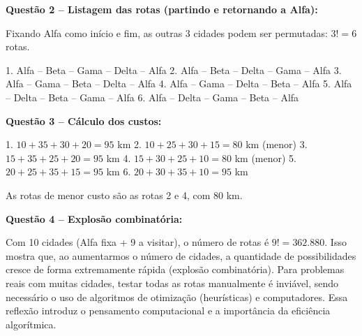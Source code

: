 \documentclass[
  12pt,
  oneside,
  a4paper,
  english,
  brazilian
  ]{abntex2}
\theoremstyle{definition}
\begin{document}
\begin{apendicesenv}
\textbf{Questão 2 – Listagem das rotas (partindo e retornando a Alfa):}

Fixando Alfa como início e fim, as outras 3 cidades podem ser permutadas: \(3! = 6\) rotas.

1. Alfa – Beta – Gama – Delta – Alfa  
2. Alfa – Beta – Delta – Gama – Alfa  
3. Alfa – Gama – Beta – Delta – Alfa  
4. Alfa – Gama – Delta – Beta – Alfa  
5. Alfa – Delta – Beta – Gama – Alfa  
6. Alfa – Delta – Gama – Beta – Alfa

\textbf{Questão 3 – Cálculo dos custos:}

1. \(10+35+30+20 = 95\) km  
2. \(10+25+30+15 = 80\) km (menor)  
3. \(15+35+25+20 = 95\) km  
4. \(15+30+25+10 = 80\) km (menor)  
5. \(20+25+35+15 = 95\) km  
6. \(20+30+35+10 = 95\) km

As rotas de menor custo são as rotas 2 e 4, com 80 km.

\textbf{Questão 4 – Explosão combinatória:}

Com 10 cidades (Alfa fixa + 9 a visitar), o número de rotas é \(9! = 362.880\). Isso mostra que, ao aumentarmos o número de cidades, a quantidade de possibilidades cresce de forma extremamente rápida (explosão combinatória). Para problemas reais com muitas cidades, testar todas as rotas manualmente é inviável, sendo necessário o uso de algoritmos de otimização (heurísticas) e computadores. Essa reflexão introduz o pensamento computacional e a importância da eficiência algorítmica.

\end{apendicesenv}
\end{document}
